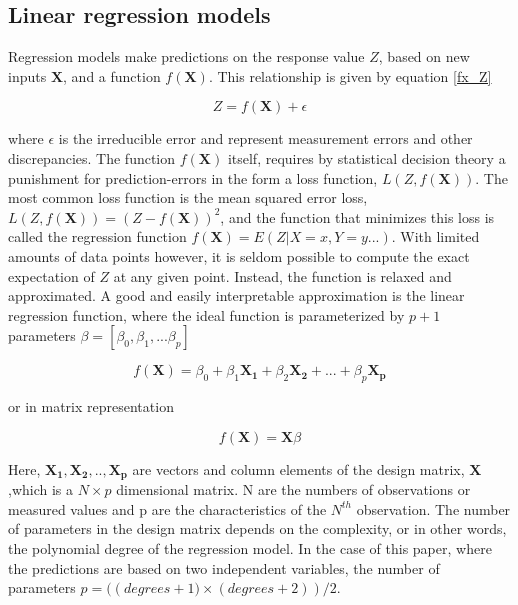 \documentclass[...,numrefs]{wiley-article}
\begin{document}
\subsection{Linear regression models}

Regression models make predictions on the response value $Z$, based on new inputs $\boldsymbol{X}$, and a function $ f(\boldsymbol{X})$. This relationship is given by equation \ref{fx_Z}

\begin{equation}
    Z =  f(\boldsymbol{X})+\epsilon
    \label{fx_Z}
\end{equation}

where $\epsilon$ is the irreducible error and represent measurement errors and other discrepancies. The function $f(\boldsymbol{X})$ itself, requires by statistical decision theory a punishment for prediction-errors in the form a loss function, $L(Z,f(\boldsymbol{X}))$. The most common loss function is the mean squared error loss, $L(Z,f(\boldsymbol{X})) = (Z-f(\boldsymbol{X}))^2$, and the function that minimizes this loss is called the regression function $f(\boldsymbol{X})= E(Z\vert{X=x,Y=y ...})$. With limited amounts of data points however, it is seldom possible to compute the exact expectation of $Z$ at any given point. Instead, the function is relaxed and approximated. A good and easily interpretable approximation is the linear regression function, where the ideal function is parameterized by $p+1$ parameters $\beta = [\beta_{0}, \beta_{1}, ... \beta_{p}]$

\begin{equation}
    f(\boldsymbol{X}) = \beta_{0}+\beta_{1}\boldsymbol{X_{1}}+\beta_{2}\boldsymbol{X_{2}}+ ... + \beta_{p}\boldsymbol{X_{p}}
    \label{fx_beta}
\end{equation}

or in matrix representation

\begin{equation}
    f(\boldsymbol{X}) = \boldsymbol{X}\beta
\end{equation}

Here, $\boldsymbol{X_{1}},\boldsymbol{X_{2}}, .., \boldsymbol{X_{p}}$ are vectors and column elements of the design matrix, $\boldsymbol{X}$ ,which is a $N\times{p}$ dimensional matrix. N are the numbers of observations or measured values and p are the characteristics of the $N^{th}$ observation. The number of parameters in the design matrix depends on the complexity, or in other words, the polynomial degree of the regression model. In the case of this paper, where the predictions are based on two independent variables, the number of parameters $p = (\left(degrees+1)\times(degrees+2)\right)/2$.
\end{document}
